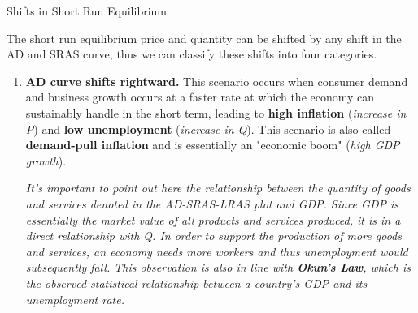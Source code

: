 \documentclass[10pt]{article}
\begin{document}
    \begin{core}[label=core:shifts]{Shifts in Short Run Equilibrium}

      The short run equilibrium price and quantity can be shifted by any shift in the AD and SRAS curve, thus we can classify these shifts into four categories.

      \begin{enumerate}

        \item \textbf{AD curve shifts rightward.} This scenario occurs when consumer demand and business growth occurs at a faster rate at which the economy can sustainably handle in the short term, leading to \textbf{high inflation} (\textit{increase in P}) and \textbf{low unemployment} (\textit{increase in Q}). This scenario is also called \textbf{demand-pull inflation} and is essentially an "economic boom" (\textit{high GDP growth}).

        \textit{It's important to point out here the relationship between the quantity of goods and services denoted in the AD-SRAS-LRAS plot and GDP. Since GDP is essentially the market value of all products and services produced, it is in a direct relationship with Q. In order to support the production of more goods and services, an economy needs more workers and thus unemployment would subsequently fall. This observation is also in line with \textbf{Okun's Law}, which is the observed statistical relationship between a country's GDP and its unemployment rate.}

\end{enumerate}
\end{core}
\end{document}
